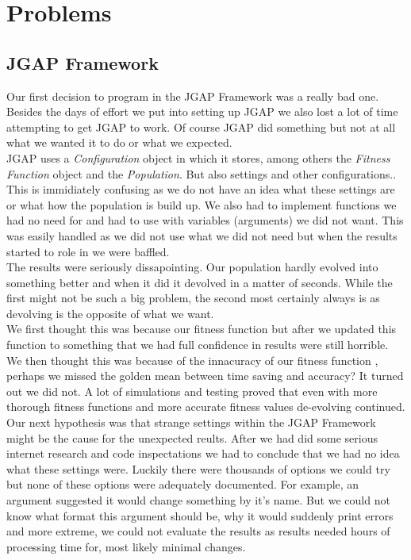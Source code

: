 \documentclass[a4paper,10pt]{article}
\begin{document}
\section{Problems}
\subsection{JGAP Framework}
Our first decision to program in the JGAP Framework was a really bad one. Besides the days of effort we put into setting up JGAP we also lost a lot of time
attempting to get JGAP to work. Of course JGAP did something but not at all what we wanted it to do or what we expected. \\

JGAP uses a \textit{Configuration} object in which it stores, among others the \textit{Fitness Function} object and the \textit{Population}. But also settings 
and other configurations.. This is immidiately confusing as we do not have an idea what these settings are or what how the population is build up. We also had to 
implement functions we had no need for and had to use with variables (arguments) we did not want. This was easily handled as we did not use what we did not need but when 
the results started to role in we were baffled. \\

The results were seriously dissapointing. Our population hardly evolved into something better and when it did it devolved in a matter of seconds. While the first might not
be such a big problem, the second most certainly always is as devolving is the opposite of what we want.\\

We first thought this was because our fitness function but after
we updated this function to something that we had full confidence in results were still horrible. \\

We then thought this was because of the innacuracy of our fitness function
, perhaps we missed the golden mean between time saving and accuracy? It turned out we did not. A lot of simulations and testing proved that even with more thorough 
fitness functions and more accurate fitness values de-evolving continued. \\

Our next hypothesis was that strange settings within the JGAP Framework might be the cause for the unexpected reults. After we had did some serious internet research 
and code inspectations we had to conclude that 
we had no idea what these settings were. Luckily there were thousands of options we could try but none of these options were adequately documented. For example, an 
argument suggested it would change something by it's name. But we could not know what format this argument should be, why it would suddenly print errors and more extreme, 
we could not evaluate the results as results needed hours of processing time for, most likely minimal changes. \\
\end{document}
